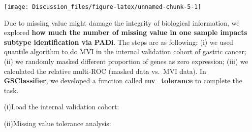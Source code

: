 \documentclass[
  12pt,
]{book}
\newenvironment{Shaded}{\begin{snugshade}}{\end{snugshade}}
\newcommand{\AttributeTok}[1]{\textcolor[rgb]{0.77,0.63,0.00}{#1}}
\newcommand{\CommentTok}[1]{\textcolor[rgb]{0.56,0.35,0.01}{\textit{#1}}}
\newcommand{\DecValTok}[1]{\textcolor[rgb]{0.00,0.00,0.81}{#1}}
\newcommand{\FloatTok}[1]{\textcolor[rgb]{0.00,0.00,0.81}{#1}}
\newcommand{\FunctionTok}[1]{\textcolor[rgb]{0.00,0.00,0.00}{#1}}
\newcommand{\NormalTok}[1]{#1}
\newcommand{\OtherTok}[1]{\textcolor[rgb]{0.56,0.35,0.01}{#1}}
\newcommand{\SpecialCharTok}[1]{\textcolor[rgb]{0.00,0.00,0.00}{#1}}
\newcommand{\StringTok}[1]{\textcolor[rgb]{0.31,0.60,0.02}{#1}}
\begin{document}
\begin{center}\texttt{[image: Discussion\_files/figure-latex/unnamed-chunk-5-1]} \end{center}

Due to missing value might damage the integrity of biological information, we explored \textbf{how much the number of missing value in one sample impacts subtype identification via PADi}. The steps are as following: (i) we used quantile algorithm to do MVI in the internal validation cohort of gastric cancer; (ii) we randomly masked different proportion of genes as zero expression; (iii) we calculated the relative multi-ROC \citep{pROC} (masked data vs.~MVI data). In \textbf{GSClassifier}, we developed a function called \textbf{mv\_tolerance} to complete the task.

(i)Load the internal validation cohort:

\begin{Shaded}
\end{Shaded}

(ii)Missing value tolerance analysis:
\end{document}
